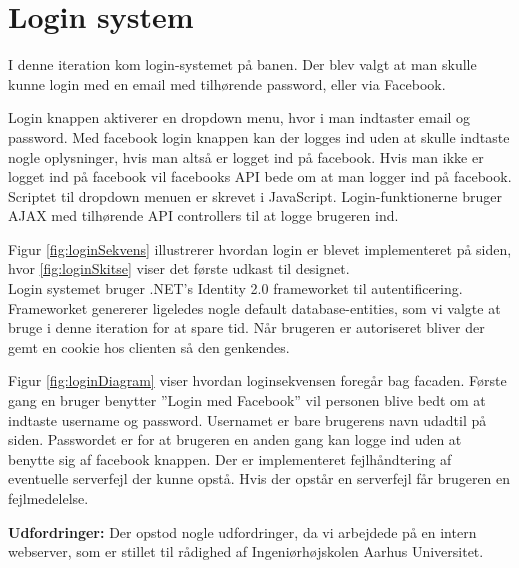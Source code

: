 \section{Login system}

I denne iteration kom login-systemet på banen. Der blev valgt at man skulle kunne login med en email med tilhørende password, eller via Facebook.


Login knappen aktiverer en dropdown menu, hvor i man indtaster email og password. Med facebook login knappen kan der logges ind uden at skulle indtaste nogle oplysninger, hvis man altså er logget ind på facebook. Hvis man ikke er logget ind på facebook vil facebooks API bede om at man logger ind på facebook. Scriptet til dropdown menuen er skrevet i JavaScript. Login-funktionerne bruger AJAX med tilhørende API controllers til at logge brugeren ind.


Figur \ref{fig:loginSekvens} illustrerer hvordan login er blevet implementeret på siden, hvor \ref{fig:loginSkitse} viser det første udkast til designet. \\

Login systemet bruger .NET's Identity 2.0 frameworket til autentificering. Frameworket genererer ligeledes nogle default database-entities, som vi valgte at bruge i denne iteration for at spare tid. Når brugeren er autoriseret bliver der gemt en cookie hos clienten så den genkendes.



Figur \ref{fig:loginDiagram} viser hvordan loginsekvensen foregår bag facaden. Første gang en bruger benytter ''Login med Facebook'' vil personen blive bedt om at indtaste username og password. Usernamet er bare brugerens navn udadtil på siden. Passwordet er for at brugeren en anden gang kan logge ind uden at benytte sig af facebook knappen. Der er implementeret fejlhåndtering af eventuelle serverfejl der kunne opstå. Hvis der opstår en serverfejl får brugeren en fejlmedelelse.

\textbf{Udfordringer:} 
Der opstod nogle udfordringer, da vi arbejdede på en intern webserver, som er stillet til rådighed af Ingeniørhøjskolen Aarhus Universitet. 

